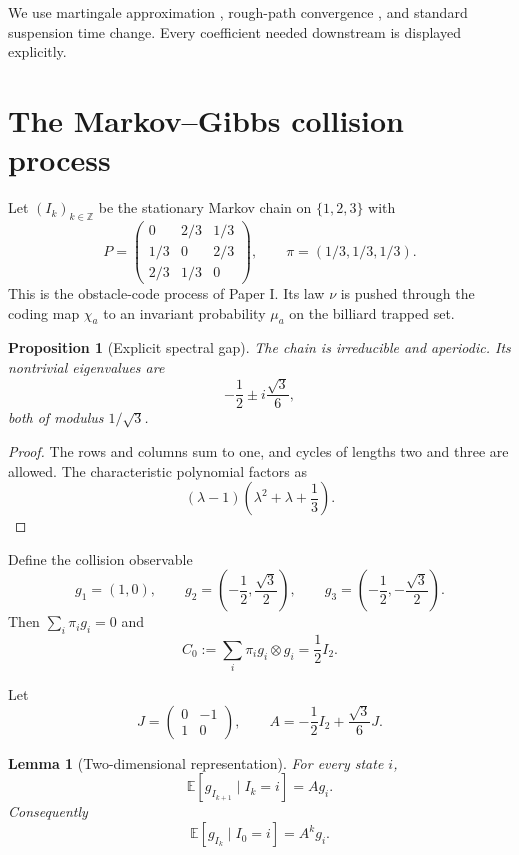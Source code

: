 \documentclass[11pt,reqno]{amsart}
\newtheorem{proposition}[theorem]{Proposition}
\newtheorem{lemma}[theorem]{Lemma}
\theoremstyle{definition}
\theoremstyle{remark}
\newcommand{\E}{\mathbb E}
\begin{document}
We use martingale approximation \cite{Gordin1969,HallHeyde1980},
rough-path convergence \cite{FrizVictoir2010,FrizHairer2014,
KellyMelbourne2016}, and standard suspension time change.  Every coefficient
needed downstream is displayed explicitly.

\section{The Markov--Gibbs collision process}\label{sec:markov}

Let $(I_k)_{k\in\mathbb Z}$ be the stationary Markov chain on
$\{1,2,3\}$ with
\[
 P=\begin{pmatrix}
 0&2/3&1/3\\
 1/3&0&2/3\\
 2/3&1/3&0
 \end{pmatrix},
 \qquad \pi=(1/3,1/3,1/3).
\]
This is the obstacle-code process of Paper I.  Its law $\nu$ is pushed through
the coding map $\chi_a$ to an invariant probability $\mu_a$ on the billiard
trapped set.

\begin{proposition}[Explicit spectral gap]\label{prop:gap}
The chain is irreducible and aperiodic.  Its nontrivial eigenvalues are
\[
 -\frac12\pm i\frac{\sqrt3}{6},
\]
both of modulus $1/\sqrt3$.
\end{proposition}

\begin{proof}
The rows and columns sum to one, and cycles of lengths two and three are
allowed.  The characteristic polynomial factors as
\[
 (\lambda-1)\left(\lambda^2+\lambda+\frac13\right).
\]
\end{proof}

Define the collision observable
\[
 g_1=(1,0),\qquad
 g_2=\left(-\frac12,\frac{\sqrt3}{2}\right),\qquad
 g_3=\left(-\frac12,-\frac{\sqrt3}{2}\right).
\]
Then $\sum_i\pi_ig_i=0$ and
\[
 C_0:=\sum_i\pi_i g_i\otimes g_i=\frac12I_2.
\]

Let
\[
 J=\begin{pmatrix}0&-1\\1&0\end{pmatrix},\qquad
 A=-\frac12I_2+\frac{\sqrt3}{6}J.
\]

\begin{lemma}[Two-dimensional representation]\label{lem:representation}
For every state $i$,
\[
 \E[g_{I_{k+1}}\mid I_k=i]=Ag_i.
\]
Consequently
\[
 \E[g_{I_k}\mid I_0=i]=A^kg_i.
\]
\end{lemma}
\end{document}
